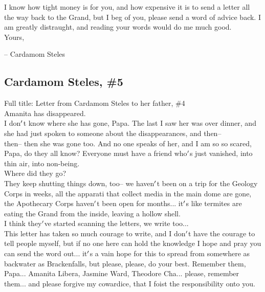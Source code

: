 \documentclass[12pt]{article}
\begin{document}
  
    I know how tight money is for you, and how expensive it is to send a letter all the way back to the Grand, but I beg of you, please send a word of advice back. I am greatly distraught, and reading your words would do me much good.\\Yours,

-- Cardamom Steles\\

\newpage

\label{sec:lore/cardamom5}
\subsection*{Cardamom Steles, \#5}


  
    Full title: Letter from Cardamom Steles to her father, \#4\\Amanita has disappeared.\\I don$\rq$t know where she has gone, Papa. The last I saw her was over dinner, and she had just spoken to someone about the disappearances, and then--\\


  
    then-- then she was gone too. And no one speaks of her, and I am so so scared, Papa, do they all know? Everyone must have a friend who$\rq$s just vanished, into thin air, into non-being.\\Where did they go?\\


  
    They keep shutting things down, too-- we haven$\rq$t been on a trip for the Geology Corps in weeks, all the apparati that collect media in the main dome are gone, the Apothecary Corps haven$\rq$t been open for months... it$\rq$s like termites are eating the Grand from the inside, leaving a hollow shell.\\I think they$\rq$ve started scanning the letters, we write too...\\


  
    This letter has taken so much courage to write, and I don$\rq$t have the courage to tell people myself, but if no one here can hold the knowledge I hope and pray you can send the word out... it$\rq$s a vain hope for this to spread from somewhere as backwater as Brackenfalls, but please, please, do your best. Remember them, Papa... Amanita Libera, Jasmine Ward, Theodore Cha... please, remember them... and please forgive my cowardice, that I foist the responsibility onto you.\\
\end{document}
